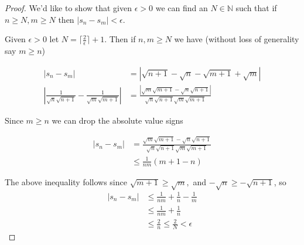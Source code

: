 \documentclass[11pt]{article}
\theoremstyle{plain}
\theoremstyle{remark}
\begin{document}
 \begin{proof}
 	We'd like to show that given $\epsilon>0$ we can find an $N\in \mathbb N$ such that if $n\geq N, m\geq N$ then $|s_n-s_m|<\epsilon$.
 	
 	Given $\epsilon>0$ let $N=\lceil\frac{2}{\epsilon}\rceil+1$. Then if $n,m\geq N$ we have (without loss of generality say $m\geq n$)
 	
 	\begin{align*}
 	|s_n-s_m|&=|\sqrt{n+1}-\sqrt{n}-\sqrt{m+1}+\sqrt{m}|\\
 	|\frac{1}{\sqrt n \sqrt{n+1}}-\frac{1}{\sqrt m \sqrt{m+1}}|&= \frac{|\sqrt m \sqrt{m+1}-\sqrt n \sqrt{n+1}|}{\sqrt n \sqrt{n+1}\sqrt m \sqrt{m+1}}
 	\end{align*} 
 	
 	
 	Since $m\geq n$ we can drop the absolute value signs
 	
 	\begin{align*}
 	|s_n-s_m|&=\frac{\sqrt m \sqrt{m+1}-\sqrt n \sqrt{n+1}}{\sqrt n \sqrt{n+1}\sqrt m \sqrt{m+1}}\\
 	&\leq \frac{1}{nm}(m+1-n)
 	\end{align*}
 	
 	The above inequality follows since $\sqrt{m+1}\geq \sqrt m,$ and $-\sqrt{n}\geq-\sqrt{n+1}$, so
 	\begin{align*}
 	|s_n-s_m|&\leq \frac{1}{nm}+\frac 1 n - \frac 1 m\\
 	&\leq \frac{1}{nm}+\frac 1 n\\
 	&\leq \frac 2 n \leq \frac 2 N < \epsilon
 	\end{align*} 
 \end{proof}
\end{document}
